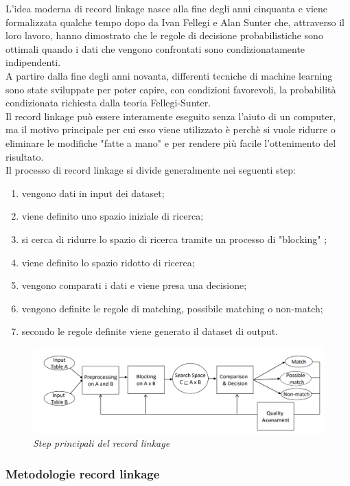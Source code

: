 \documentclass[a4paper,12pt]{article}
\begin{document}
\noindent L'idea moderna di record linkage nasce alla fine degli anni cinquanta e viene formalizzata qualche tempo dopo da Ivan Fellegi e Alan Sunter \cite{fellegi69} che, attraverso il loro lavoro, hanno dimostrato che le regole di decisione probabilistiche sono ottimali quando i dati che vengono confrontati sono condizionatamente indipendenti. \\
\noindent A partire dalla fine degli anni novanta, differenti tecniche di machine learning sono state sviluppate per poter capire, con condizioni favorevoli, la probabilità condizionata richiesta dalla teoria Fellegi-Sunter. \\
\noindent Il record linkage può essere interamente eseguito senza l'aiuto di un computer, ma il motivo principale per cui esso viene utilizzato è perchè si vuole ridurre o eliminare le modifiche "fatte a mano" e per rendere più facile l'ottenimento del risultato. \\
\newpage
\noindent Il processo di record linkage si divide generalmente nei seguenti step:
\begin{enumerate}
\item vengono dati in input dei dataset;
\item viene definito uno spazio iniziale di ricerca;
\item si cerca di ridurre lo spazio di ricerca tramite un processo di "blocking" ;
\item viene definito lo spazio ridotto di ricerca;
\item vengono comparati i dati e viene presa una decisione;
\item vengono definite le regole di matching, possibile matching o non-match;
\item secondo le regole definite viene generato il dataset di output.
\end{enumerate}

\begin{figure}[H]
	\centering
	\includegraphics[width=0.8\linewidth]{img/recordlinkage.png}
	\caption{\textit{Step principali del record linkage}}
\end{figure}

\subsubsection{Metodologie record linkage}
\end{document}
